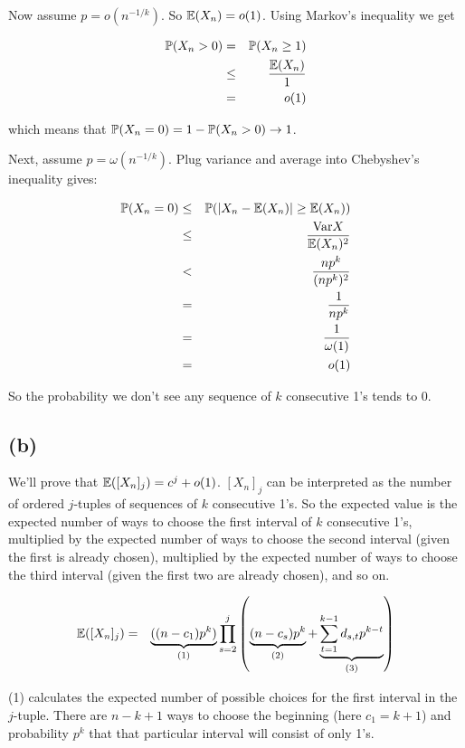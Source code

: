 \documentclass[a4paper]{article}
\begin{document}
Now assume $ p = o(n^{-1/k}) $. So $ \E(X_n) = o(1) $. Using Markov's inequality we get

\begin{eqnarray*}
\P(X_n > 0)
  &=& \P(X_n \ge 1) \\
  &\le& \frac{\E(X_n)}{1} \\
  &=& o(1) \\
\end{eqnarray*}

which means that $ \P(X_n = 0) = 1 - \P(X_n > 0) \to 1 $.

Next, assume $ p = \omega(n^{-1/k}) $. Plug variance and average into Chebyshev's inequality gives:

\begin{eqnarray*}
\P(X_n = 0)
  &\le& \P(|X_n - \E(X_n)| \ge \E(X_n)) \\
  &\le& \frac{\Var X}{\E(X_n)^2} \\
  &<& \frac{np^k}{(np^k)^2} \\
  &=& \frac{1}{np^k} \\
  &=& \frac{1}{\omega(1)} \\
  &=& o(1) \\
\end{eqnarray*}

So the probability we don't see any sequence of $ k $ consecutive 1's tends to 0.

\subsection*{(b)}

We'll prove that $ \E([X_n]_j) = c^j + o(1) $. $ [X_n]_j $ can be interpreted
as the number of ordered $j$-tuples of sequences of $ k $ consecutive 1's. So
the expected value is the expected number of ways to choose the first interval
of $ k $ consecutive 1's, multiplied by the expected number of ways to choose
the second interval (given the first is already chosen), multiplied by the
expected number of ways to choose the third interval (given the first two are
already chosen), and so on.

\begin{eqnarray*}
\E([X_n]_j)
  &=& \underbrace{((n - c_1)p^k)}_{(1)}\prod_{s=2}^{j}\B{\underbrace{(n - c_s)p^k}_{(2)} + \underbrace{\sum_{t=1}^{k-1} d_{s,t} p^{k-t}}_{(3)}}
\end{eqnarray*}

(1) calculates the expected number of possible choices for the first interval
in the $j$-tuple. There are $ n - k + 1 $ ways to choose the beginning (here $ c_1 = k+1 $) and probability $ p^k $ that that particular interval will consist of only 1's.
\end{document}

